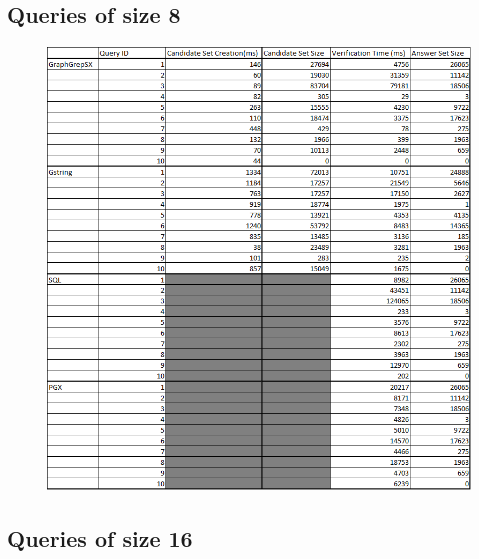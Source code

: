 \documentclass[12pt,a4paper]{report}
\begin{document}
\newpage
\subsection*{Queries of size 8}

\begin{figure}[h]
	\centering
	\includegraphics[width=1\textwidth]{../img/q8.png}
\end{figure}

\newpage
\subsection*{Queries of size 16}
\end{document}
